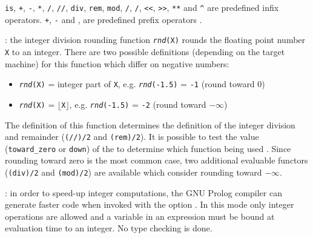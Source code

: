 \texttt{is}, \texttt{+}, \texttt{-}, \texttt{*}, \texttt{/}, \texttt{//},
\texttt{div}, \texttt{rem}, \texttt{mod}, \texttt{/{\bs}}, \texttt{{\bs}/},
\texttt{<<}, \texttt{>>}, \texttt{**} and \texttt{\^{}} are predefined infix
operators. \texttt{+}, \texttt{-} and \texttt{{\bs}}, are predefined prefix
operators .

: the integer division rounding
function \texttt{\textit{rnd}(X)} rounds the floating point number
\texttt{X} to an integer. There are two possible definitions (depending on
the target machine) for this function which differ on negative numbers:

\begin{itemize}

\item \texttt{\textit{rnd}(X)} = integer part of \texttt{X}, e.g.
\texttt{\textit{rnd}(-1.5)} = \texttt{-1} (round toward 0)

\item \texttt{\textit{rnd}(X)} = $\lfloor$\texttt{X}$\rfloor$, e.g.
\texttt{\textit{rnd}(-1.5)} = \texttt{-2} (round toward $-\infty$)

\end{itemize}

The definition of this function determines the definition of the integer
division and remainder (\texttt{(//)/2} and \texttt{(rem)/2}). It is
possible to test the value (\texttt{toward\_zero} or \texttt{down}) of the
  to determine which
function being used . Since rounding toward zero is
the most common case, two additional evaluable functors (\texttt{(div)/2} and
\texttt{(mod)/2}) are available which consider rounding toward $-\infty$.


: in order to speed-up integer computations,
the GNU Prolog compiler can generate faster code when invoked with the
 option . In this mode only
integer operations are allowed and a variable in an expression must be bound
at evaluation time to an integer. No type checking is done.

\begin{PlErrors}






\end{PlErrors}

